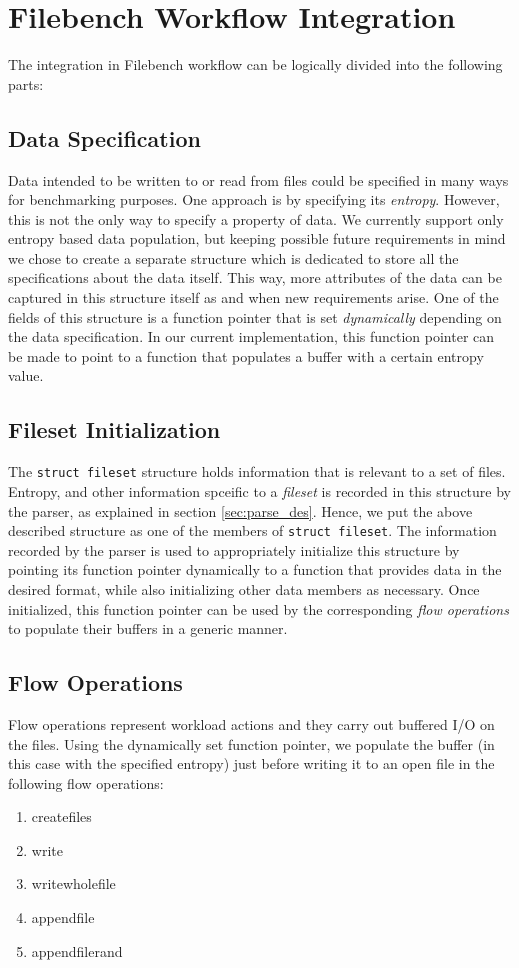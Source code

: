 \section{Filebench Workflow Integration}
The integration in Filebench workflow can be logically divided into the following parts:

\subsection{Data Specification}

Data intended to be written to or read from files could be specified in many ways for benchmarking purposes. One approach is by specifying its \textit{entropy}. However, this is not the only way to specify a property of data. We currently support only entropy based data population, but keeping possible future requirements in mind we chose to create a separate structure which is dedicated to store all the specifications about the data itself. This way, more attributes of the data can be captured in this structure itself as and when new requirements arise. One of the fields of this structure is a function pointer that is set \textit{dynamically} depending on the data specification. In our current implementation, this function pointer can be made to point to a function that populates a buffer with a certain entropy value.

\subsection{Fileset Initialization}
The \texttt{struct fileset} structure holds information that is relevant to a set of files. Entropy, and other information spceific to a \textit{fileset} is recorded in this structure by the parser, as explained in section \ref{sec:parse_des}. Hence, we put the above described structure as one of the members of \verb+struct fileset+. The information recorded by the parser is used to appropriately initialize this structure by pointing its function pointer dynamically to a function that provides data in the desired format, while also initializing other data members as necessary. Once initialized, this function pointer can be used by the corresponding \textit{flow operations} to populate their buffers in a generic manner.

\subsection{Flow Operations}
Flow operations represent workload actions and they carry out buffered I/O on the files. Using the dynamically set function pointer, we populate the buffer (in this case with the specified entropy) just before writing it to an open file in the following flow operations:
\begin{enumerate}
\item createfiles
\item write
\item writewholefile
\item appendfile
\item appendfilerand
\end{enumerate}
